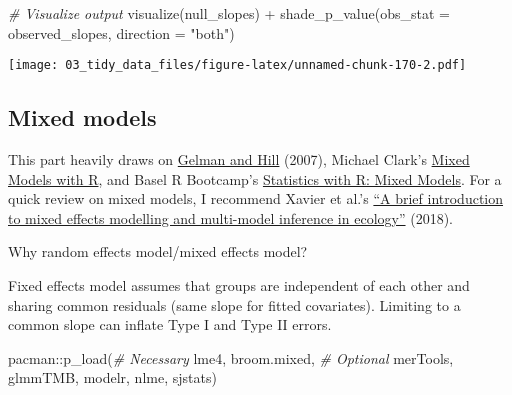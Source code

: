 \documentclass[
]{book}
\newenvironment{Shaded}{\begin{snugshade}}{\end{snugshade}}
\newcommand{\AttributeTok}[1]{\textcolor[rgb]{0.77,0.63,0.00}{#1}}
\newcommand{\CommentTok}[1]{\textcolor[rgb]{0.56,0.35,0.01}{\textit{#1}}}
\newcommand{\FunctionTok}[1]{\textcolor[rgb]{0.00,0.00,0.00}{#1}}
\newcommand{\NormalTok}[1]{#1}
\newcommand{\SpecialCharTok}[1]{\textcolor[rgb]{0.00,0.00,0.00}{#1}}
\newcommand{\StringTok}[1]{\textcolor[rgb]{0.31,0.60,0.02}{#1}}
\begin{document}
\begin{Shaded}
\begin{Highlighting}[]
\CommentTok{\# Visualize output }
\FunctionTok{visualize}\NormalTok{(null\_slopes) }\SpecialCharTok{+}
  \FunctionTok{shade\_p\_value}\NormalTok{(}\AttributeTok{obs\_stat =}\NormalTok{ observed\_slopes, }
                \AttributeTok{direction =} \StringTok{"both"}\NormalTok{)}
\end{Highlighting}
\end{Shaded}

\texttt{[image: 03\_tidy\_data\_files/figure-latex/unnamed-chunk-170-2.pdf]}

\hypertarget{mixed-models}{%
\subsection{Mixed models}\label{mixed-models}}

This part heavily draws on \href{http://www.stat.columbia.edu/~gelman/arm/}{Gelman and Hill} (2007), Michael Clark's \href{https://m-clark.github.io/mixed-models-with-R/}{Mixed Models with R}, and Basel R Bootcamp's \href{https://therbootcamp.github.io/SwR_2019Apr/_sessions/MixedModels/MixedModels_practical.html}{Statistics with R: Mixed Models}. For a quick review on mixed models, I recommend Xavier et al.'s \href{https://peerj.com/articles/4794/}{``A brief introduction to mixed effects modelling and multi-model inference in ecology''} (2018).

Why random effects model/mixed effects model?

Fixed effects model assumes that groups are independent of each other and sharing common residuals (same slope for fitted covariates). Limiting to a common slope can inflate Type I and Type II errors.

\begin{Shaded}
\begin{Highlighting}[]
\NormalTok{pacman}\SpecialCharTok{::}\FunctionTok{p\_load}\NormalTok{(}\CommentTok{\# Necessary  }
\NormalTok{               lme4, }
\NormalTok{               broom.mixed, }
               \CommentTok{\# Optional }
\NormalTok{               merTools,}
\NormalTok{               glmmTMB, }
\NormalTok{               modelr, }
\NormalTok{               nlme, }
\NormalTok{               sjstats)}
\end{Highlighting}
\end{Shaded}
\end{document}
